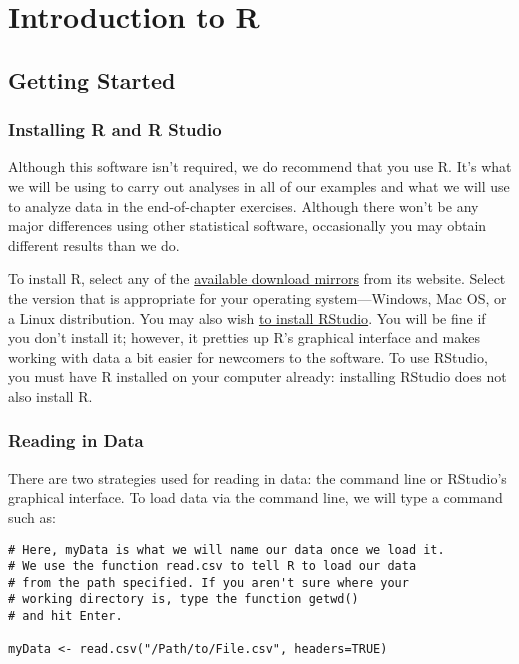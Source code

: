
\chapter[Introduction to R]{Introduction to R}

\section{Getting Started}

\subsection{Installing R and R Studio}
Although this software isn't required, we do recommend that you use R. It's what we will be using to carry out analyses in all of our examples and what we will use to analyze data in the end-of-chapter exercises. Although there won't be any major differences using other statistical software, occasionally you may obtain different results than we do.

To install R, select any of the \href{http://cran.r-project.org/mirrors.html}{available download mirrors} from its website. Select the version that is appropriate for your operating system---Windows, Mac OS, or a Linux distribution. You may also wish \href{http://www.rstudio.com/}{to install RStudio}. You will be fine if you don't install it; however, it pretties up R's graphical interface and makes working with data a bit easier for newcomers to the software. To use RStudio, you must have R installed on your computer already: installing RStudio does not also install R.

\subsection{Reading in Data}
There are two strategies used for reading in data: the command line or RStudio's graphical interface. To load data via the command line, we will type a command such as:
\clearpage
\begin{framed}
\begin{Verbatim}[samepage=TRUE]
# Here, myData is what we will name our data once we load it.
# We use the function read.csv to tell R to load our data
# from the path specified. If you aren't sure where your
# working directory is, type the function getwd()
# and hit Enter.
 
myData <- read.csv("/Path/to/File.csv", headers=TRUE)
\end{Verbatim}
\end{framed}


